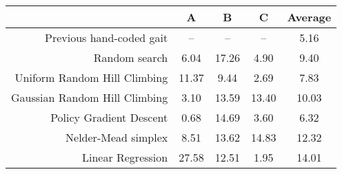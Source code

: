 \begin{tabular}{|r|c|c|c||c|}
\hline
                                         & A       & B      & C      &  Average \\
\hline                                                               
\hline                                                               
Previous hand-coded gait                 & --      & --     & --     &  5.16 \\
\hline                                                                 
Random search                            & 6.04    & 17.26  & 4.90   &  9.40 \\
\hline                                                                 
Uniform Random Hill Climbing             & 11.37   & 9.44   & 2.69   &  7.83 \\
\hline                                                                 
Gaussian Random Hill Climbing            & 3.10    & 13.59  & 13.40  &  10.03 \\
\hline                                                                 
Policy Gradient Descent                  & 0.68    & 14.69  & 3.60   &  6.32 \\
\hline                                                                 
Nelder-Mead simplex                      & 8.51    & 13.62  & 14.83  &  12.32 \\
\hline                                                                 
Linear Regression                        & 27.58   & 12.51  & 1.95   &  14.01 \\
\hline
\end{tabular}




